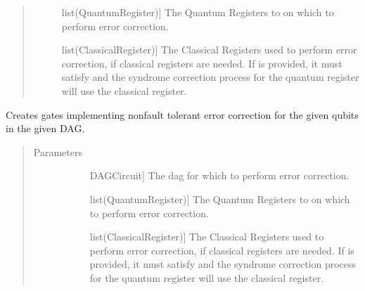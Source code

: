 \documentclass[letterpaper,10pt,english]{sphinxmanual}
\begin{document}
\begin{fulllineitems}
\begin{fulllineitems}
\begin{quote}
\begin{description}
\begin{description}
\item[{}] \leavevmode{[}list(QuantumRegister){]}
\sphinxAtStartPar
The Quantum Registers to on which to perform error correction.

\item[{}] \leavevmode{[}list(ClassicalRegister){]}
\sphinxAtStartPar
The Classical Registers used to perform error correction, if classical registers are needed. If  is provided, it must satisfy  and the syndrome correction process for the  quantum register will use the  classical register.

\end{description}

\end{description}\end{quote}

\end{fulllineitems}


\begin{fulllineitems}
\label{\detokenize{Steane:Steane.SteaneErrorCorrector.errorCorrectDag}}
\sphinxAtStartPar
Creates gates implementing non\sphinxhyphen{}fault tolerant error correction for the given qubits in the given DAG.
\begin{quote}\begin{description}
\item[{Parameters}] \leavevmode\begin{description}
\item[{}] \leavevmode{[}DAGCircuit{]}
\sphinxAtStartPar
The dag for which to perform error correction.

\item[{}] \leavevmode{[}list(QuantumRegister){]}
\sphinxAtStartPar
The Quantum Registers to on which to perform error correction.

\item[{}] \leavevmode{[}list(ClassicalRegister){]}
\sphinxAtStartPar
The Classical Registers used to perform error correction, if classical registers are needed. If  is provided, it must satisfy  and the syndrome correction process for the  quantum register will use the  classical register.


\end{description}
\end{description}
\end{quote}
\end{fulllineitems}
\end{fulllineitems}
\end{document}
